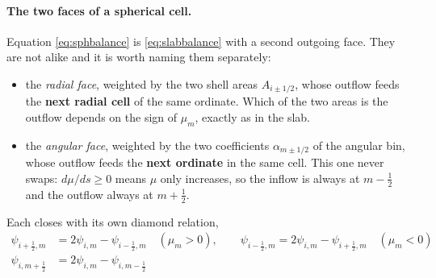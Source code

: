 \documentclass[11pt]{article}
\begin{document}
\paragraph{The two faces of a spherical cell.} Equation \eqref{eq:sphbalance} is
\eqref{eq:slabbalance} with a second outgoing face. They are not alike and it is worth naming
them separately:
\begin{itemize}
    \item the \emph{radial face}, weighted by the two shell areas
    $A_{i\pm1/2}$, whose outflow feeds the \textbf{next radial cell} of the same ordinate.
    Which of the two areas is the outflow depends on the sign of $\mu_m$, exactly as in the
    slab.
    \item the \emph{angular face}, weighted by the two coefficients
    $\alpha_{m\pm1/2}$ of the angular bin, whose outflow feeds the \textbf{next ordinate} in
    the same cell. This one never swaps: $d\mu/ds\ge0$ means $\mu$ only increases, so the
    inflow is always at $m-\tfrac12$ and the outflow always at $m+\tfrac12$.
\end{itemize}
Each closes with its own diamond relation,
\begin{align}
    \psi_{i+\frac12,m} &= 2\psi_{i,m} - \psi_{i-\frac12,m}
        \quad (\mu_m>0), \qquad
    \psi_{i-\frac12,m} = 2\psi_{i,m} - \psi_{i+\frac12,m} \quad (\mu_m<0)
        \label{eq:closr} \\
    \psi_{i,m+\frac12} &= 2\psi_{i,m} - \psi_{i,m-\frac12}
        \label{eq:closmu}
\end{align}
\end{document}

